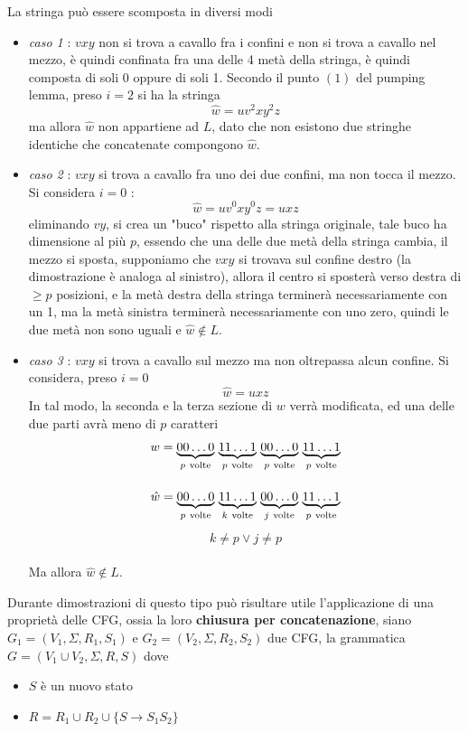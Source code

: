 \documentclass[10pt, letterpaper]{report}
\begin{document}
La stringa può essere scomposta in diversi modi\begin{itemize}
    \item \textit{caso 1} : $vxy$ non si trova a cavallo fra i confini e non si trova a cavallo nel mezzo, è 
    quindi confinata fra una delle 4 metà della stringa, è quindi composta di soli 0 oppure di soli 1. Secondo il punto 
 $(1)$ del pumping lemma, preso $i=2$ si ha la stringa $$ \hat w = uv^2xy^2z$$
ma allora $\hat w$ non appartiene ad $L$, dato che non esistono due stringhe identiche che concatenate compongono $\hat w$. 
\item \textit{caso 2} : $vxy$ si trova a cavallo fra uno dei due confini, ma non tocca il mezzo. Si considera $i=0$ : 
$$ \hat w = uv^0xy^0z=uxz$$
eliminando $vy$, si crea un "buco" rispetto alla stringa originale, tale buco ha dimensione 
al più $p$, essendo che una delle due metà della stringa cambia, il mezzo si sposta, supponiamo che $vxy$ si trovava sul confine 
destro (la dimostrazione è analoga al sinistro), allora il centro si sposterà verso destra di $\ge p$ posizioni, e la metà destra della 
stringa terminerà necessariamente con un 1, ma la metà sinistra terminerà necessariamente con uno zero, quindi le due metà 
non sono uguali e $\hat w\notin L$. 
\item \textit{caso 3} : $vxy$ si trova a cavallo sul mezzo ma non oltrepassa alcun confine. Si considera, preso $i=0$
$$ \hat w = uxz$$ 
In tal modo, la seconda e la terza sezione di $w$ verrà modificata, ed una delle due parti avrà meno di $p$ caratteri 
$$  w = \smash{\underbrace{00\dots 0}_{p\ \text{volte}}} \
\smash{\underbrace{11\dots 1}_{p\ \text{volte}}} \
\smash{\underbrace{00\dots 0}_{p\ \text{volte}}} \
\smash{\underbrace{11\dots 1}_{p\ \text{volte}}} $$ 
\\
$$ \hat w = \smash{\underbrace{00\dots 0}_{p\ \text{volte}}} \
\smash{\underbrace{11\dots 1}_{k\ \text{volte}}} \
\smash{\underbrace{00\dots 0}_{j\ \text{volte}}} \
\smash{\underbrace{11\dots 1}_{p\ \text{volte}}} $$\\ $$k\ne p\lor j\ne p $$
\\Ma allora $\hat w \notin L$.
\end{itemize}
Durante dimostrazioni di questo tipo può risultare utile l'applicazione di una proprietà delle CFG, ossia la loro 
\textbf{chiusura per concatenazione}, siano $G_1=(V_1,\Sigma, R_1, S_1)$ e $G_2=(V_2,\Sigma, R_2, S_2)$ due CFG, la grammatica 
$G=(V_1\cup V_2,\Sigma, R, S)$ dove \begin{itemize}
    \item $S$ è un nuovo stato 
    \item $R=R_1\cup R_2\cup\{S\rightarrow S_1S_2\}$
\end{itemize}
\end{document}
